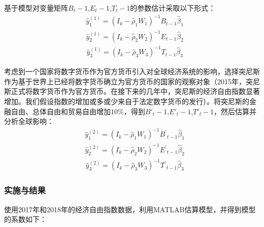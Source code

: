 \documentclass[withoutpreface,bwprint]{cumcmthesis} %
\begin{document}
基于模型对变量矩阵$B_t-1$,$E_t-1$,$T_t-1$的参数估计采取以下形式：
\begin{equation}
	\begin{aligned}
		& \hat{y}_1^{(1)}=\left(I_k-\hat{\rho}_1 W_1\right)^{-1} B_{t-1} \hat{\beta}_1 
	\end{aligned}
\end{equation}
\begin{equation}
	\begin{aligned}
		& \hat{y}_2^{(1)}=\left(I_k-\hat{\rho}_2 W_2\right)^{-1} E_{t-1} \hat{\beta}_2 
	\end{aligned}
\end{equation}		
\begin{equation}
	\begin{aligned}
		& \hat{y}_3^{(1)}=\left(I_k-\hat{\rho}_3 W_3\right)^{-1} T_{t-1} \hat{\beta}_3
	\end{aligned}
\end{equation}	

考虑到一个国家将数字货币作为官方货币引入对全球经济系统的影响，选择突尼斯作为基于世界上已经将数字货币确立为官方货币的国家的观察对象（2015年，突尼斯正式将数字货币作为官方货币。在接下来的几年中，突尼斯的经济自由指数显著增加。我们假设指数的增加或多或少来自于法定数字货币的发行）。将突尼斯的金融自由、总体自由和贸易自由增加$10\%$，得到$B′_t-1$,$E′_t-1$,$T′_t-1$，然后估算并分析全球影响：
\begin{equation}
	\begin{aligned}
		& \hat{y}_1^{(2)}=\left(I_k-\hat{\rho}_1 W_1\right)^{-1} B^{\prime}{ }_{t-1} \hat{\beta}_1 
	\end{aligned}
\end{equation}
\begin{equation}
	\begin{aligned}
		& \hat{y}_2^{(2)}=\left(I_k-\hat{\rho}_2 W_2\right)^{-1} E^{\prime}{ }_{t-1} \hat{\beta}_2 
	\end{aligned}
\end{equation}		
\begin{equation}
	\begin{aligned}
		& \hat{y}_3^{(2)}=\left(I_k-\hat{\rho}_3 W_3\right)^{-1} T^{\prime}{ }_{t-1} \hat{\beta}_3
	\end{aligned}
\end{equation}	

\subsubsection{实施与结果}
使用2017年和2018年的经济自由指数数据，利用MATLAB估算模型，并得到模型的系数如下：
\end{document}
